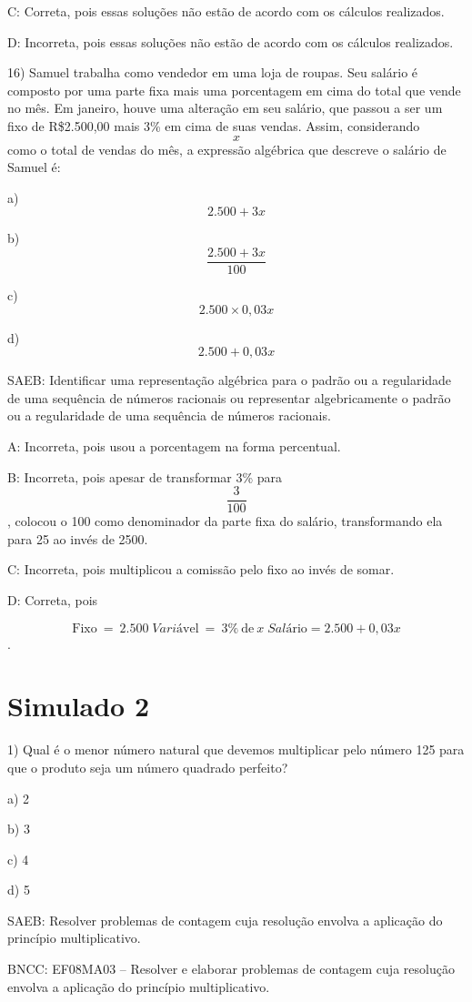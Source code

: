 C: Correta, pois essas soluções não estão de acordo com os cálculos
realizados.

D: Incorreta, pois essas soluções não estão de acordo com os cálculos
realizados.

16) Samuel trabalha como vendedor em uma loja de roupas. Seu salário é
composto por uma parte fixa mais uma porcentagem em cima do total que
vende no mês. Em janeiro, houve uma alteração em seu salário, que passou
a ser um fixo de R\$2.500,00 mais 3\% em cima de suas vendas. Assim,
considerando \[x\] como o total de vendas do mês, a expressão algébrica
que descreve o salário de Samuel é:

a) \[2.500 + 3x\]

b) \[\frac{2.500 + 3x}{100}\]

c) \[2.500 \times 0,03x\]

d) \[2.500 + 0,03x\]

SAEB: Identificar uma representação algébrica para o padrão ou a
regularidade de uma sequência de números racionais ou representar
algebricamente o padrão ou a regularidade de uma sequência de números
racionais.

A: Incorreta, pois usou a porcentagem na forma percentual.

B: Incorreta, pois apesar de transformar 3\% para \[\frac{3}{100}\],
colocou o 100 como denominador da parte fixa do salário, transformando
ela para 25 ao invés de 2500.

C: Incorreta, pois multiplicou a comissão pelo fixo ao invés de somar.

D: Correta, pois

\[\text{Fixo}\ = \ 2.500 \; {Vari}á\text{vel}\  = \ 3\%\ \text{de}\ x \; {Sal}á\text{rio} = 2.500 + 0,03x\].

\hypertarget{simulado-2}{%
\section{Simulado 2}\label{simulado-2}}

1) Qual é o menor número natural que devemos multiplicar pelo número 125
para que o produto seja um número quadrado perfeito?

a) 2

b) 3

c) 4

d) 5

SAEB: Resolver problemas de contagem cuja resolução envolva a aplicação
do princípio multiplicativo.

BNCC: EF08MA03 -- Resolver e elaborar problemas de contagem cuja
resolução envolva a aplicação do princípio multiplicativo.

